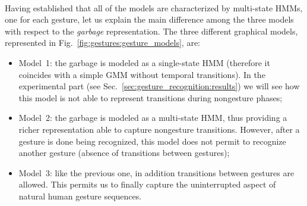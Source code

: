 \begin{figure*}
\centering
\subfloat[][Model~1.]
{
   \modelone
   \label{fig:gestures:gesture_models:gmmhmm}
}
%
\subfloat[][Model~2.]
{
  \modeltwo
\label{fig:gestures:gesture_models:hmms} }
\\ %
\subfloat[][Model~3.]
{
  \modelthree
  \label{fig:gestures:gesture_models:hmms_combined}
}
%
\caption[Different \acl{HMM} structures considered when developing our gesture recognizer.]{Different \acl{HMM} structures considered when developing our gesture recognizer. Every state is associated to an emission \acl{PDF} which is a mixture of Gaussians. \\%
Model~1: one multi-state \ac{HMM} per human gesture, one single-state \ac{HMM} (i.e., a \ac{GMM} without transitions) for garbage data. Each model in~$\{\text{hmm1, hmm2, hmm3}\}$ is independent from the other ones and can have an arbitrary number of states. \\%
Model~2: one multi-state \ac{HMM} per human gesture, one multi-state \ac{HMM} for garbage data. Each model in~$\{\text{hmm1, hmm2, hmm3, garbage}\}$ is independent from the other ones and can have an arbitrary number of states \\%
Model~3. one multi-state \ac{HMM} per human gesture, one multi-state \ac{HMM} for garbage data. These four configurations are then merged with an outer transition loop. Each rectangle represents a gestural \ac{HMM} like the ones shown in Fig.~\ref{fig:gestures:gesture_models:hmms}, however, because of the merging, the original state indexes of~$\{\text{hmm1, hmm2, hmm3, garbage}\}$ must be now uniquely renumbered.}
\label{fig:gestures:gesture_models}
\end{figure*}

Having established that all of the models are characterized by multi-state \acp{HMM}, one for each gesture, let us explain the main difference among the three models with respect to the \emph{garbage} representation.
The three different graphical models, represented in Fig.~\ref{fig:gestures:gesture_models}, are:
\begin{itemize}
\item Model~1: the garbage is modeled as a single-state \ac{HMM} (therefore it coincides with a simple \ac{GMM} without temporal transitions). In the experimental part (see Sec.~\ref{sec:gesture_recognition:results}) we will see how this model is not able to represent transitions during nongesture phases;

\item Model~2: the garbage is modeled as a multi-state \ac{HMM}, thus providing a richer representation able to capture nongesture transitions. However, after a gesture is done being recognized, this model does not permit to recognize another gesture (absence of transitions between gestures);

\item Model~3: like the previous one, in addition transitions between gestures are allowed. This permits us to finally capture the uninterrupted aspect of natural human gesture sequences.
\end{itemize}

